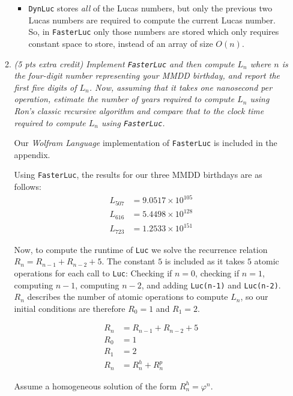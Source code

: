 \documentclass[12pt]{article}
\begin{document}
\begin{enumerate}
\begin{enumerate}
\begin{itemize}
        \item {\tt DynLuc} stores \textit{all} of the Lucas numbers, but only the previous two Lucas numbers are required to compute the current Lucas number. So, in {\tt FasterLuc} only those numbers are stored which only requires 
constant space to store, instead of an array of size $O(n)$.
    \end{itemize}

    \newpage
	\item \textit{(5 pts extra credit) Implement {\tt FasterLuc} and then compute $L_{n}$ where $n$ is the four-digit number representing your MMDD birthday, and report the first five digits of $L_{n}$. Now, assuming that it 
takes one nanosecond per operation, estimate the number of years required to compute $L_{n}$ using Ron's classic recursive algorithm and compare that to the clock time required to compute $L_{n}$ using {\tt FasterLuc}.}
	

    Our \textit{Wolfram Language} implementation of {\tt FasterLuc} is included in the appendix.
    
    Using {\tt FasterLuc}, the results for our three MMDD birthdays are as follows:
    \begin{align*}
        L_{507} &= 9.0517 \times 10^{105}\\
        L_{616} &= 5.4498\times 10^{128}\\
        L_{723} &= 1.2533\times 10^{151}
    \end{align*}
    
    Now, to compute the runtime of {\tt Luc} we solve the recurrence relation $R_n = R_{n-1} + R_{n-2} + 5$. The constant $5$ is included as it takes $5$ atomic operations for each call to {\tt Luc}: Checking if $n=0$, checking if 
$n=1$, computing $n-1$, computing $n-2$, and adding {\tt Luc(n-1)} and {\tt Luc(n-2)}. $R_n$ describes the number of atomic operations to compute $L_n$, so our initial conditions are therefore $R_0 = 1$ and $R_1 = 2$.
    
    \begin{align*}
        R_n &= R_{n-1} + R_{n-2} + 5\\
        R_0 &= 1\\
        R_1 &= 2\\
        R_n &= R_n^h + R_n^p
    \end{align*}
    
    Assume a homogeneous solution of the form $R_n^h = \varphi^n$.
    

\end{enumerate}
\end{enumerate}
\end{document}
